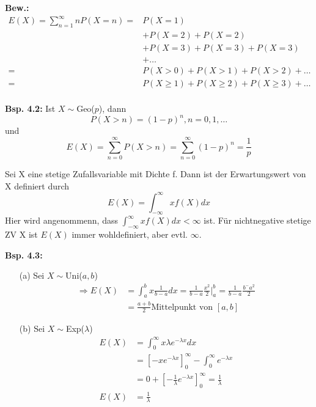 \documentclass[a4paper,11pt]{article}
\begin{document}
\noindent\textbf{Bew.:}
\begin{align*}
E(X) = \sum_{n=1}^{\infty}nP(X=n) =& P(X=1)\\
& + P(X=2) + P(X=2)\\
& +P(X=3) + P(X=3) + P(X=3)\\
& + \dots\\
=& P(X>0) + P(X>1) + P(X>2) + \dots\\
=& P(X\geq 1) + P(X\geq 2) + P(X\geq 3) + \dots\\
\end{align*}

\vspace{6pt}
\noindent\textbf{Bsp. 4.2:} Ist $X\sim$Geo($p$), dann
\[P(X>n)=(1-p)^n, n=0,1,\dots\]
und
\[E(X)=\sum_{n=0}^{\infty}P(X>n)=\sum_{n=0}^{\infty}(1-p)^n=\frac{1}{p}\] 

\vspace{6pt}
\noindent Sei X eine stetige Zufallsvariable mit Dichte f. Dann ist der Erwartungswert von X definiert durch
\[E(X)=\int_{-\infty}^{\infty}xf(X)dx\]
Hier wird angenommenn, dass $\int_{-\infty}^{\infty}xf(X)dx<\infty$ ist. 
\newline Für nichtnegative stetige ZV X ist $E(X)$ immer wohldefiniert, aber evtl. $\infty$. 

\vspace{6pt}
\noindent\textbf{Bsp. 4.3:}
\begin{itemize}
    \item[(a)] Sei $X\sim$Uni($a,b$)
    \begin{align*}
    \Rightarrow E(X) &= \int_{a}^{b}x\frac{1}{b-a}dx = \frac{1}{b-a}\frac{x^2}{2}|_a^b = \frac{1}{b-a}\frac{b^-a^2}{2}\\
    &= \frac{a+b}{2} \text{Mittelpunkt von }[a,b]
    \end{align*}
    \item[(b)] Sei $X\sim$Exp($\lambda$)
    \begin{align}
    E(X) &= \int_{0}^{\infty}x\lambda e^{-\lambda x}dx\\
    &= [-xe^{-\lambda x}]_0^\infty - \int_{0}^{\infty}e^{-\lambda x}\\
    &= 0 + [-\frac{1}{\lambda}e^{-\lambda x}]_{0}^{\infty}=\frac{1}{\lambda}\\
    E(X) &= \frac{1}{\lambda}\\
    \end{align}
\end{itemize}
\end{document}
